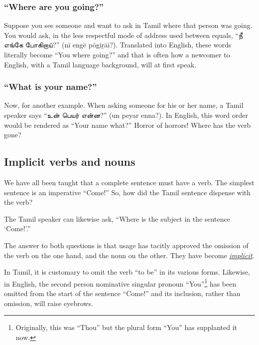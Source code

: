 \documentclass[
  12pt,
  a4paper,
]{article}
\begin{document}
\hypertarget{where-are-you-going}{%
\subsubsection{``Where are you going?''}\label{where-are-you-going}}

Suppose you see someone and want to ask in Tamil where that person was
going. You would ask, in the less respectful mode of address used
between equals, ``நீ எங்கே போகிறாய்?'' (nī engē pōgiṟāi?). Translated
into English, these words literally become ``You where going?'' and that
is often how a newcomer to English, with a Tamil language background,
will at first speak.

\hypertarget{what-is-your-name}{%
\subsubsection{``What is your name?''}\label{what-is-your-name}}

Now, for another example. When asking someone for his or her name, a
Tamil speaker says ``உன் பெயர் என்ன?'' (un peyar enna?). In English,
this word order would be rendered as ``Your name what?'' Horror of
horrors! Where has the verb gone?

\hypertarget{implicit-verbs-and-nouns}{%
\subsection{Implicit verbs and nouns}\label{implicit-verbs-and-nouns}}

We have all been taught that a complete sentence must have a verb. The
simplest sentence is an imperative ``Come!'' So, how did the Tamil
sentence dispense with the verb?

The Tamil speaker can likewise ask, ``Where is the subject in the
sentence `Come!'.''

The answer to both questions is that usage has tacitly approved the
omission of the verb on the one hand, and the noun on the other. They
have become
\href{https://www.thefreedictionary.com/implicit}{\emph{implicit}}.

In Tamil, it is customary to omit the verb ``to be'' in its various
forms. Likewise, in English, the second person nominative singular
pronoun ``You''\footnote{Originally, this was ``Thou'' but the plural
  form ``You'' has supplanted it now.} has been omitted from the start
of the sentence ``Come!'' and its inclusion, rather than omission, will
raise eyebrows.
\end{document}
